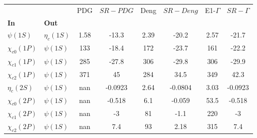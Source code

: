 \begin{tabular}{l|l|c|c|c|c|c|c}
\toprule
                &            &  PDG & $SR-PDG$ &  Deng & $SR-Deng$ &  E1-$\Gamma$ & $SR-\Gamma$ \\
\textbf{In} & \textbf{Out} &      &          &       &           &              &             \\
\midrule
\textbf{$\psi(1S)$} & \textbf{$\eta_{c}(1S)$} & 1.58 &    -13.3 &  2.39 &     -20.2 &         2.57 &       -21.7 \\
\textbf{$\chi_{c0}(1P)$} & \textbf{$\psi(1S)$} &  133 &    -18.4 &   172 &     -23.7 &          161 &       -22.2 \\
\textbf{$\chi_{c1}(1P)$} & \textbf{$\psi(1S)$} &  285 &    -27.8 &   306 &     -29.8 &          306 &       -29.9 \\
\textbf{$\chi_{c2}(1P)$} & \textbf{$\psi(1S)$} &  371 &       45 &   284 &      34.5 &          349 &        42.3 \\
\textbf{$\eta_{c}(2S)$} & \textbf{$\psi(1S)$} &  nan &  -0.0923 &  2.64 &   -0.0804 &         3.03 &     -0.0923 \\
\textbf{$\chi_{c0}(2P)$} & \textbf{$\psi(1S)$} &  nan &   -0.518 &   6.1 &    -0.059 &         53.5 &      -0.518 \\
\textbf{$\chi_{c1}(2P)$} & \textbf{$\psi(1S)$} &  nan &       -3 &    81 &      -1.1 &          220 &          -3 \\
\textbf{$\chi_{c2}(2P)$} & \textbf{$\psi(1S)$} &  nan &      7.4 &    93 &      2.18 &          315 &         7.4 \\
\bottomrule
\end{tabular}
